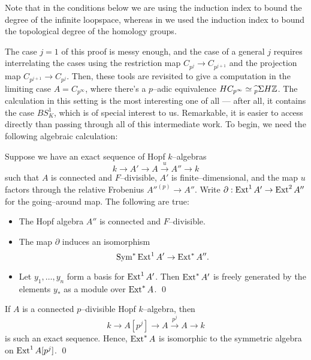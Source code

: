\begin{remark}
Note that in the conditions below we are using the induction index to bound the degree of the infinite loopspace, whereas in  we used the induction index to bound the topological degree of the homology groups.
\end{remark}


The case $j = 1$ of this proof is messy enough, and the case of a general $j$ requires interrelating the cases using the restriction map $C_{p^j} \to C_{p^{j+1}}$ and the projection map $C_{p^{j+1}} \to C_{p^j}$.  Then, these tools are revisited to give a computation in the limiting case $A = C_{p^\infty}$, where there's a $p$--adic equivalence $HC_{p^\infty} \simeq\widehat{{}_p} \Sigma H\mathbb Z$.  The calculation in this setting is the most interesting one of all --- after all, it contains the case $BS^1_K$, which is of special interest to us.  Remarkable, it is easier to access directly than passing through all of this intermediate work.  To begin, we need the following algebraic calculation:

\begin{theorem}
Suppose we have an exact sequence of Hopf $k$--algebras \[k \to A' \to A \xrightarrow{u} A'' \to k\] such that $A$ is connected and $F$--divisible, $A'$ is finite--dimensional, and the map $u$ factors through the relative Frobenius ${A''}^{(p)} \to A''$.  Write $\partial: \operatorname{Ext}^1 A' \to \operatorname{Ext}^2 A''$ for the going--around map.  The following are true:
\begin{itemize}
\item The Hopf algebra $A''$ is connected and $F$--divisible.
\item The map $\partial$ induces an isomorphism \[\operatorname{Sym}^* \operatorname{Ext}^1 A' \to \operatorname{Ext}^* A''.\]
\item Let $y_1, \ldots, y_n$ form a basis for $\operatorname{Ext}^1 A'$.  Then $\operatorname{Ext}^* A'$ is freely generated by the elements $y_*$ as a module over $\operatorname{Ext}^* A$. \qed
\end{itemize}
\end{theorem}

\begin{corollary}
If $A$ is a connected $p$--divisible Hopf $k$--algebra, then \[k \to A[p^j] \to A \xrightarrow{p^j} A \to k\] is such an exact sequence.  Hence, $\operatorname{Ext}^* A$ is isomorphic to the symmetric algebra on $\operatorname{Ext}^1 A[p^j]$.  \qed
\end{corollary}

